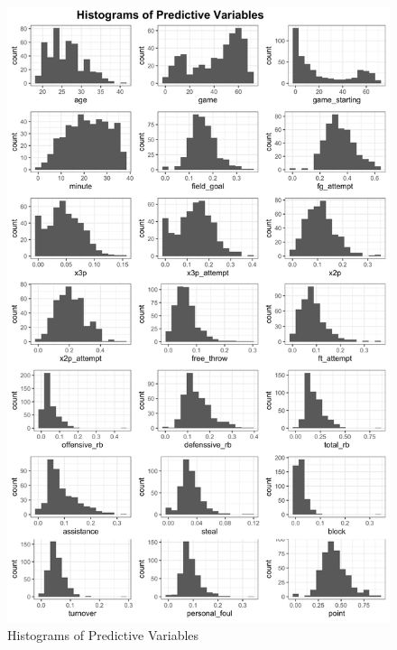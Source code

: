 \documentclass[
]{article}
\begin{document}
\begin{figure}
\centering
\includegraphics[width=\textwidth,height=0.8\textheight]{report_figures/appendixA_figure01.png}
\caption{Histograms of Predictive Variables}
\end{figure}

\newpage
\end{document}
